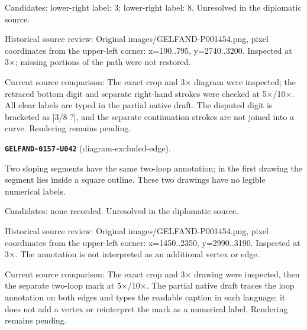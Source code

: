 Candidates: lower-right label: 3; lower-right label: 8. Unresolved in the diplomatic source.\par
Historical source review: Original images/GELFAND-P001454.png, pixel coordinates from the upper-left corner: x=190..795, y=2740..3200. Inspected at 3×; missing portions of the path were not restored.\par
Current source comparison: The exact crop and 3× diagram were inspected; the retraced bottom digit and separate right-hand strokes were checked at 5×/10×. All clear labels are typed in the partial native draft. The disputed digit is bracketed as [3/8 ?], and the separate continuation strokes are not joined into a curve. Rendering remains pending.\par\medskip
\par\noindent\leavevmode{}\label{GELFAND-0157-U042}\label{GELFAND-P001454:diagram-excluded-edge}\textbf{\texttt{GELFAND-0157-U042}} (diagram-excluded-edge).\nopagebreak[4]\par
Two sloping segments have the same two-loop annotation; in the first drawing the segment lies inside a square outline. These two drawings have no legible numerical labels.\par
Candidates: none recorded. Unresolved in the diplomatic source.\par
Historical source review: Original images/GELFAND-P001454.png, pixel coordinates from the upper-left corner: x=1450..2350, y=2990..3190. Inspected at 3×. The annotation is not interpreted as an additional vertex or edge.\par
Current source comparison: The exact crop and 3× drawing were inspected, then the separate two-loop mark at 5×/10×. The partial native draft traces the loop annotation on both edges and types the readable caption in each language; it does not add a vertex or reinterpret the mark as a numerical label. Rendering remains pending.\par\medskip
